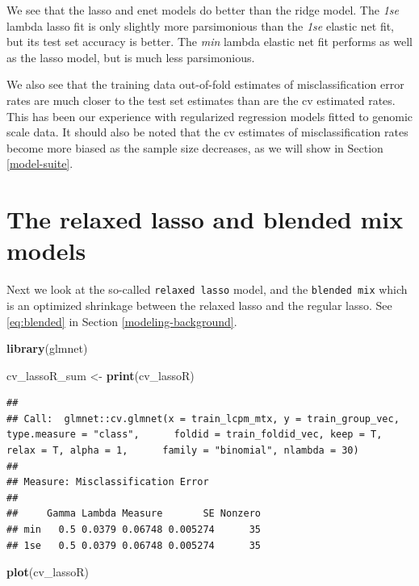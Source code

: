 \documentclass[
]{book}
\newenvironment{Shaded}{\begin{snugshade}}{\end{snugshade}}
\newcommand{\KeywordTok}[1]{\textcolor[rgb]{0.13,0.29,0.53}{\textbf{#1}}}
\newcommand{\NormalTok}[1]{#1}
\newcommand{\StringTok}[1]{\textcolor[rgb]{0.31,0.60,0.02}{#1}}
\begin{document}
We see that the lasso and enet models do better than the ridge model.
The \emph{1se} lambda lasso fit is only slightly more parsimonious than the
\emph{1se} elastic net fit, but its test set accuracy is better.
The \emph{min} lambda elastic net fit performs as well as the lasso model,
but is much less parsimonious.

We also see that the training data out-of-fold
estimates of misclassification error rates are much closer to the
test set estimates than are the cv estimated rates. This has
been our experience with regularized regression models fitted to
genomic scale data. It should also be noted that the cv estimates of
misclassification rates become more biased as the sample size decreases,
as we will show in Section \ref{model-suite}.

\hypertarget{the-relaxed-lasso-and-blended-mix-models}{%
\section{The relaxed lasso and blended mix models}\label{the-relaxed-lasso-and-blended-mix-models}}

Next we look at the so-called \texttt{relaxed\ lasso} model, and
the \texttt{blended\ mix} which is an optimized shrinkage
between the relaxed lasso and the regular lasso.
See \eqref{eq:blended} in Section \ref{modeling-background}.

\begin{Shaded}
\begin{Highlighting}[]
\KeywordTok{library}\NormalTok{(glmnet)}

\NormalTok{cv\_lassoR\_sum <{-}}\StringTok{ }\KeywordTok{print}\NormalTok{(cv\_lassoR)}
\end{Highlighting}
\end{Shaded}

\begin{verbatim}
## 
## Call:  glmnet::cv.glmnet(x = train_lcpm_mtx, y = train_group_vec, type.measure = "class",      foldid = train_foldid_vec, keep = T, relax = T, alpha = 1,      family = "binomial", nlambda = 30) 
## 
## Measure: Misclassification Error 
## 
##     Gamma Lambda Measure       SE Nonzero
## min   0.5 0.0379 0.06748 0.005274      35
## 1se   0.5 0.0379 0.06748 0.005274      35
\end{verbatim}

\begin{Shaded}
\begin{Highlighting}[]
\KeywordTok{plot}\NormalTok{(cv\_lassoR)}
\end{Highlighting}
\end{Shaded}
\end{document}
